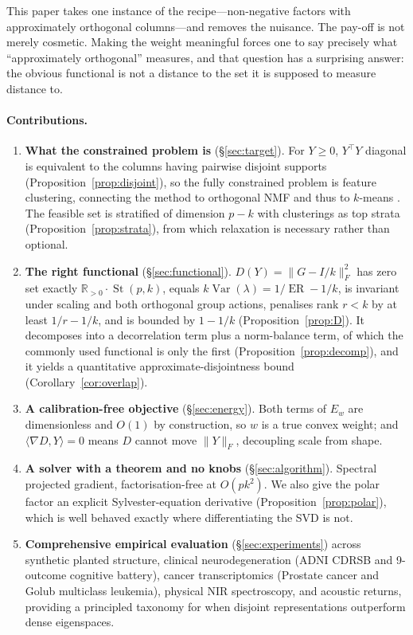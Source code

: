 \documentclass[11pt]{article}
\theoremstyle{definition}
\DeclareMathOperator{\Var}{Var}
\DeclareMathOperator{\st}{St}
\DeclareMathOperator{\ER}{ER}
\newcommand{\R}{\mathbb{R}}
\newcommand{\Rpos}{\R_{>0}}
\newcommand{\Fnorm}[1]{\lVert #1 \rVert_F}
\newcommand{\ip}[2]{\langle #1, #2 \rangle}
\begin{document}
This paper takes one instance of the recipe---non-negative factors with
approximately orthogonal columns---and removes the nuisance. The pay-off is not
merely cosmetic. Making the weight meaningful forces one to say precisely what
``approximately orthogonal'' measures, and that question has a surprising answer:
the obvious functional is not a distance to the set it is supposed to measure
distance to.

\paragraph{Contributions.}
\begin{enumerate}\itemsep2pt
\item \textbf{What the constrained problem is} (\S\ref{sec:target}).
  For $Y\ge0$, $Y^\top Y$ diagonal is equivalent to the columns having pairwise
  disjoint supports (Proposition~\ref{prop:disjoint}), so the fully constrained
  problem is feature clustering, connecting the method to orthogonal NMF and thus
  to $k$-means \citep{ding2006}. The feasible set is stratified of dimension
  $p-k$ with clusterings as top strata (Proposition~\ref{prop:strata}), from
  which relaxation is necessary rather than optional.
\item \textbf{The right functional} (\S\ref{sec:functional}).
  $D(Y)=\Fnorm{G-I/k}^2$ has zero set exactly $\Rpos\cdot\st(p,k)$, equals
  $k\Var(\lambda)=1/\ER-1/k$, is invariant under scaling and both orthogonal
  group actions, penalises rank $r<k$ by at least $1/r-1/k$, and is bounded by
  $1-1/k$ (Proposition~\ref{prop:D}). It decomposes into a decorrelation term
  plus a norm-balance term, of which the commonly used functional is only the
  first (Proposition~\ref{prop:decomp}), and it yields a quantitative
  approximate-disjointness bound (Corollary~\ref{cor:overlap}).
\item \textbf{A calibration-free objective} (\S\ref{sec:energy}).
  Both terms of $E_w$ are dimensionless and $O(1)$ by construction, so $w$ is a
  true convex weight; and $\ip{\nabla D}{Y}=0$ means $D$ cannot move
  $\Fnorm{Y}$, decoupling scale from shape.
\item \textbf{A solver with a theorem and no knobs} (\S\ref{sec:algorithm}).
  Spectral projected gradient, factorisation-free at $O(pk^2)$. We also give the
  polar factor an explicit Sylvester-equation derivative
  (Proposition~\ref{prop:polar}), which is well behaved exactly where
  differentiating the SVD is not.
\item \textbf{Comprehensive empirical evaluation} (\S\ref{sec:experiments})
  across synthetic planted structure, clinical neurodegeneration (ADNI CDRSB and
  9-outcome cognitive battery), cancer transcriptomics (Prostate cancer and Golub
  multiclass leukemia), physical NIR spectroscopy, and acoustic returns,
  providing a principled taxonomy for when disjoint representations outperform
  dense eigenspaces.
\end{enumerate}
\end{document}
